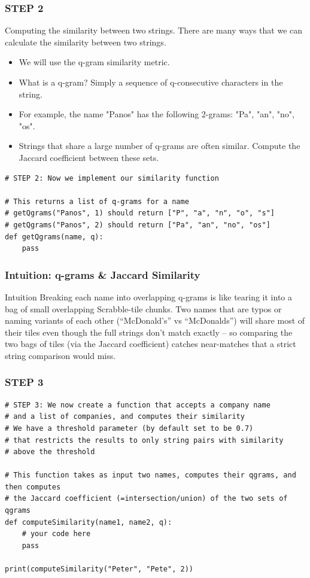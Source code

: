 \begin{frame}[fragile]\frametitle{STEP 2}
Computing the similarity between two strings. There are many ways that we can calculate the similarity between two strings. 
  \begin{itemize}
  \item We will use the q-gram similarity metric. 
  \item What is a q-gram? Simply a sequence of q-consecutive characters in the string. 
  \item For example, the name "Panos" has the following 2-grams: "Pa", "an", "no", "os". 
  \item Strings that share a large number of q-grams are often similar. Compute the Jaccard coefficient between these sets. 
  \end{itemize}
  \begin{lstlisting}
# STEP 2: Now we implement our similarity function

# This returns a list of q-grams for a name
# getQgrams("Panos", 1) should return ["P", "a", "n", "o", "s"]
# getQgrams("Panos", 2) should return ["Pa", "an", "no", "os"]
def getQgrams(name, q):
    pass
  \end{lstlisting}
\end{frame}

\begin{frame}[fragile]\frametitle{Intuition: q-grams \& Jaccard Similarity}
\begin{block}{Intuition}
Breaking each name into overlapping q-grams is like tearing it into a bag of small overlapping
Scrabble-tile chunks. Two names that are typos or naming variants of each other (``McDonald's''
vs ``McDonalds'') will share most of their tiles even though the full strings don't match
exactly -- so comparing the two bags of tiles (via the Jaccard coefficient) catches near-matches
that a strict string comparison would miss.
\end{block}
\end{frame}

\begin{frame}[fragile]\frametitle{STEP 3}
  \begin{lstlisting}
# STEP 3: We now create a function that accepts a company name
# and a list of companies, and computes their similarity
# We have a threshold parameter (by default set to be 0.7)
# that restricts the results to only string pairs with similarity
# above the threshold

# This function takes as input two names, computes their qgrams, and then computes
# the Jaccard coefficient (=intersection/union) of the two sets of qgrams
def computeSimilarity(name1, name2, q):
    # your code here
    pass
    
print(computeSimilarity("Peter", "Pete", 2))
  \end{lstlisting}
\end{frame}

